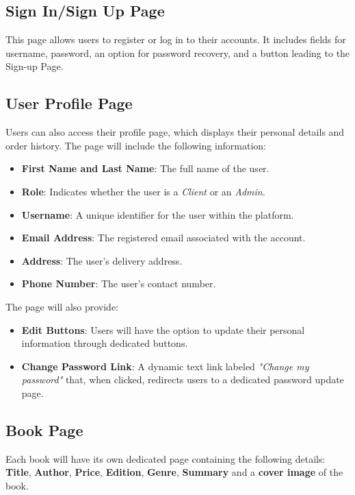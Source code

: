 \subsection{Sign In/Sign Up Page} \label{sec:signin}
This page allows users to register or log in to their accounts. It includes fields for username, password, an option for password recovery, and a button leading to the Sign-up Page.


\subsection{User Profile Page} \label{sec:profile}
Users can also access their profile page, which displays their personal details and order history. The page will include the following information:

\begin{itemize}
    \item \textbf{First Name and Last Name}: The full name of the user.
    \item \textbf{Role}: Indicates whether the user is a \textit{Client} or an \textit{Admin}.
    \item \textbf{Username}: A unique identifier for the user within the platform.
    \item \textbf{Email Address}: The registered email associated with the account.
    \item \textbf{Address}: The user's delivery address.
    \item \textbf{Phone Number}: The user's contact number.
\end{itemize}

The page will also provide:
\begin{itemize}
    \item \textbf{Edit Buttons}: Users will have the option to update their personal information through dedicated buttons.
    \item \textbf{Change Password Link}: A dynamic text link labeled \textit{"Change my password"} that, when clicked, redirects users to a dedicated password update page.
\end{itemize}

\subsection{Book Page} \label{sec:book}
Each book will have its own dedicated page containing the following details: \textbf{Title}, \textbf{Author}, \textbf{Price}, \textbf{Edition}, \textbf{Genre}, \textbf{Summary} and a \textbf{cover image} of the book.


